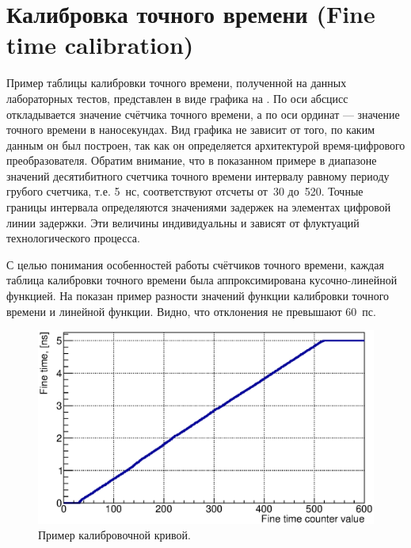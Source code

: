 \section{Калибровка точного времени (Fine time calibration)}\label{sec:secFineTimeCalib}

Пример таблицы калибровки точного времени, полученной на данных лабораторных тестов, представлен в виде графика на . По оси абсцисс откладывается значение счётчика точного времени, а по оси ординат --- значение точного времени в наносекундах. Вид графика не зависит от того, по каким данным он был построен, так как он определяется архитектурой время-цифрового преобразователя. Обратим внимание, что в показанном примере в диапазоне значений десятибитного счетчика точного времени интервалу равному периоду грубого счетчика, т.е. 5~нс, соответствуют отсчеты от~30 до~520. Точные границы интервала определяются значениями задержек на элементах цифровой линии задержки. Эти величины индивидуальны и зависят от флуктуаций технологического процесса.

С целью понимания особенностей работы счётчиков точного времени, каждая таблица калибровки точного времени была аппроксимирована кусочно-линейной функцией. На  показан пример разности значений функции калибровки точного времени и линейной функции. Видно, что отклонения не превышают 60~пс.

\begin{figure}[H]
\centering
\includegraphics[width=1.0\textwidth]{pictures/17_CalTable_0010_01_feb2017.eps}
\caption{Пример калибровочной кривой.}
\label{fig:TypicalCalibTable}
\end{figure}

